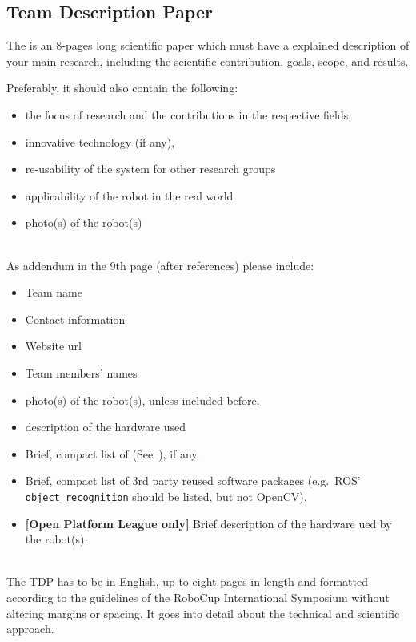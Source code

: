 \subsection{Team Description Paper}
\label{rule:website_tdp}
The  is an 8-pages long scientific paper which must have a explained description of your main research, including the scientific contribution, goals, scope, and results.

Preferably, it should also contain the following:
\begin{itemize}
	\item the focus of research and the contributions in the respective fields,
	\item innovative technology (if any),
	\item re-usability of the system for other research groups
	\item applicability of the robot in the real world
	\item photo(s) of the robot(s)
\end{itemize}

~\\\noindent As addendum in the 9th page (after references) please include:
\begin{itemize}
	\item Team name
	\item Contact information
	\item Website url
	\item Team members' names
	\item photo(s) of the robot(s), unless included before.
	\item description of the hardware used
	\item Brief, compact list of  (See~), if any.
	\item Brief, compact list of 3rd party reused software packages (e.g.~ROS' \texttt{object\_recognition} should be listed, but not OpenCV).
	\item \textbf{[Open Platform League only]} Brief description of the hardware ued by the robot(s).
\end{itemize}

~\\\noindent The TDP has to be in English, up to eight pages in length and formatted according to the guidelines of the RoboCup International Symposium without altering margins or spacing. It goes into detail about the technical and scientific approach.

